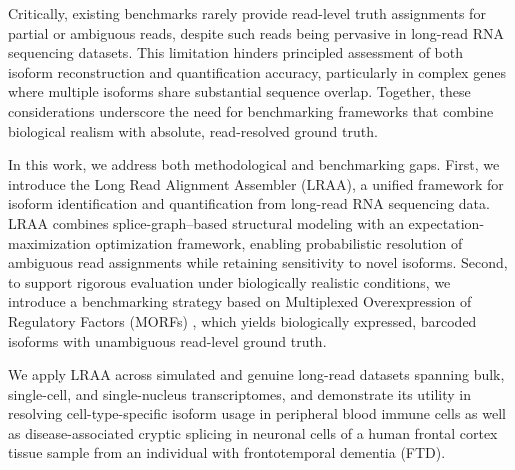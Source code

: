 Critically, existing benchmarks rarely provide read-level truth assignments for partial or ambiguous reads, despite such reads being pervasive in long-read RNA sequencing datasets. This limitation hinders principled assessment of both isoform reconstruction and quantification accuracy, particularly in complex genes where multiple isoforms share substantial sequence overlap. Together, these considerations underscore the need for benchmarking frameworks that combine biological realism with absolute, read-resolved ground truth.

In this work, we address both methodological and benchmarking gaps. First, we introduce the Long Read Alignment Assembler (LRAA), a unified framework for isoform identification and quantification from long-read RNA sequencing data. LRAA combines splice-graph--based structural modeling with an expectation-maximization optimization framework, enabling probabilistic resolution of ambiguous read assignments while retaining sensitivity to novel isoforms. Second, to support rigorous evaluation under biologically realistic conditions, we introduce a benchmarking strategy based on Multiplexed Overexpression of Regulatory Factors (MORFs) \citep{joung2023}, which yields biologically expressed, barcoded isoforms with unambiguous read-level ground truth.

We apply LRAA across simulated and genuine long-read datasets spanning bulk, single-cell, and single-nucleus transcriptomes, and demonstrate its utility in resolving cell-type-specific isoform usage in peripheral blood immune cells as well as disease-associated cryptic splicing in neuronal cells of a human frontal cortex tissue sample from an individual with frontotemporal dementia (FTD).

